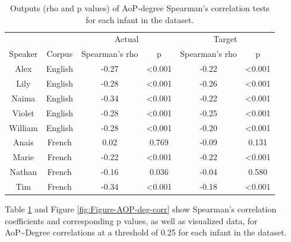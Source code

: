 \documentclass[
  man,floatsintext]{apa6}
\begin{document}
\begin{longtable}[t]{cccccc}
\caption{\label{tab:table-aop-deg-corr}Outputs (rho and p values) of AoP-degree Spearman's correlation tests for each infant in the dataset.}\\
\toprule
\multicolumn{2}{c}{ } & \multicolumn{2}{c}{Actual} & \multicolumn{2}{c}{Target} \\
\cmidrule(l{3pt}r{3pt}){3-4} \cmidrule(l{3pt}r{3pt}){5-6}
Speaker & Corpus & Spearman's rho & p & Spearman's rho & p\\
\midrule
Alex & English & -0.27 & <0.001 & -0.22 & <0.001\\
Lily & English & -0.28 & <0.001 & -0.26 & <0.001\\
Naima & English & -0.34 & <0.001 & -0.22 & <0.001\\
Violet & English & -0.28 & <0.001 & -0.25 & <0.001\\
William & English & -0.28 & <0.001 & -0.20 & <0.001\\
\addlinespace
Anais & French & 0.02 & 0.769 & -0.09 & 0.131\\
Marie & French & -0.22 & <0.001 & -0.22 & <0.001\\
Nathan & French & -0.16 & 0.036 & -0.04 & 0.580\\
Tim & French & -0.34 & <0.001 & -0.18 & <0.001\\
\bottomrule
\end{longtable}

Table \ref{tab:table-aop-deg-corr} and Figure \ref{fig:Figure-AOP-deg-corr} show Spearman's correlation coefficients and corresponding p values, as well as visualized data, for AoP\textasciitilde Degree correlations at a threshold of 0.25 for each infant in the dataset.
\end{document}
